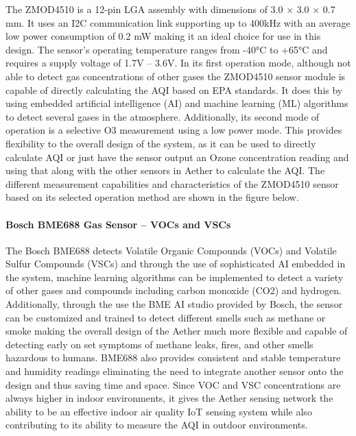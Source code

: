 The ZMOD4510 is a 12-pin LGA assembly with dimensions of 3.0 × 3.0 × 0.7 mm. It uses an I2C communication link supporting up to 400kHz with an average low power consumption of 0.2 mW making it an ideal choice for use in this design. The sensor’s operating temperature ranges from -40°C to +65°C and requires a supply voltage of 1.7V – 3.6V. In its first operation mode, although not able to detect gas concentrations of other gases the ZMOD4510 sensor module is capable of directly calculating the AQI based on EPA standards. It does this by using embedded artificial intelligence (AI) and machine learning (ML) algorithms to detect several gases in the atmosphere. Additionally, its second mode of operation is a selective O3 measurement using a low power mode. This provides flexibility to the overall design of the system, as it can be used to directly calculate AQI or just have the sensor output an Ozone concentration reading and using that along with the other sensors in Aether to calculate the AQI. The different measurement capabilities and characteristics of the ZMOD4510 sensor  based on its selected operation method are shown in the figure below. 

\paragraph{Bosch BME688 Gas Sensor – VOCs and VSCs}
The Bosch BME688 detects Volatile Organic Compounds (VOCs) and Volatile Sulfur Compounds (VSCs) and through the use of sophisticated AI embedded in the system, machine learning algorithms can be implemented to detect a variety of other gases and compounds including carbon monoxide (CO2) and hydrogen. Additionally, through the use the BME AI studio provided by Bosch, the sensor can be customized and trained to detect different smells such as methane or smoke making the overall design of the Aether much more flexible and capable of detecting early on set symptoms of methane leaks, fires, and other smells hazardous to humans. BME688 also provides consistent and stable temperature and humidity readings eliminating the need to integrate another sensor onto the design and thus saving time and space. Since VOC and VSC concentrations are always higher in indoor environments, it gives the Aether sensing network the ability to be an effective indoor air quality IoT sensing system while also contributing to its ability to measure the AQI in outdoor environments. 


